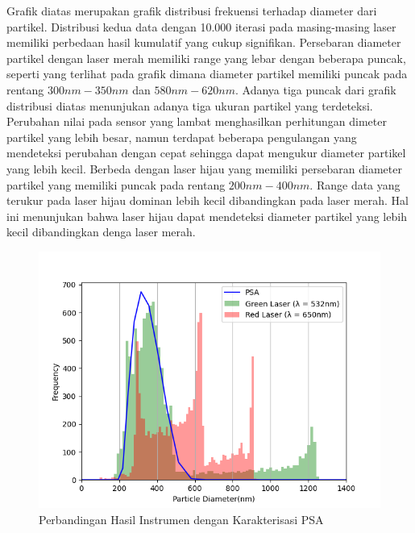 Grafik diatas merupakan grafik distribusi frekuensi terhadap
diameter dari partikel. Distribusi kedua data dengan 10.000
iterasi pada masing-masing laser memiliki perbedaan hasil
kumulatif yang cukup signifikan. Persebaran diameter partikel
dengan laser merah memiliki range yang lebar dengan beberapa
puncak, seperti yang terlihat pada grafik dimana diameter
partikel memiliki puncak pada rentang ${300nm-350nm}$ dan
${580nm-620nm}$. Adanya tiga puncak dari grafik distribusi diatas
menunjukan adanya tiga ukuran partikel yang terdeteksi. Perubahan
nilai pada sensor yang lambat menghasilkan perhitungan dimeter
partikel yang lebih besar, namun terdapat beberapa pengulangan
yang mendeteksi perubahan dengan cepat sehingga dapat mengukur
diameter partikel yang lebih kecil. Berbeda dengan laser hijau
yang memiliki persebaran diameter partikel yang memiliki puncak
pada rentang ${200nm-400nm}$. Range data yang terukur pada laser
hijau dominan lebih kecil dibandingkan pada laser merah. Hal ini
menunjukan bahwa laser hijau dapat mendeteksi diameter partikel
yang lebih kecil dibandingkan denga laser merah.

\begin{figure}[H]
  \centering
  \includegraphics[width=13cm]{Images/DistribusiWithPSAHist.png}
  \caption{Perbandingan Hasil Instrumen dengan Karakterisasi PSA}
  \label{fig:distwpsa}
\end{figure}





